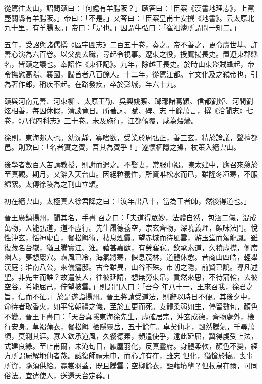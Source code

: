 \begin{pinyinscope}
 從駕往太山，詔問賾曰：「何處有羊腸阪？」賾答曰：「臣案《漢書地理志》，上黨壺關縣有羊腸阪。」帝曰：「不是。」又答曰：「臣案皇甫士安撰《地書》。云太原北
 九十里，有羊腸阪。」帝曰：「是也。」因謂牛弘曰：「崔祖濬所謂問一知二。」



 五年，受詔與諸儒撰《區宇圖志》二百五十卷，奏之。帝不善之，更令虞世基、許善心演為六百卷。以父憂去職，尋起令視事。遼東之役，授鷹揚長史。置遼東郡縣名，皆賾之議也。奉詔作《東征記》。九年，除越王長史。於時山東盜賊蜂起，帝令撫慰高陽、襄國，歸首者八百餘人。十二年，從駕江都。宇文化及之弒帝也，引為著作郎，稱疾不起。在路發疾，卒於彭城，年六十九。


賾與河南元善、河東柳
 、太原王劭、吳興姚察、瑯琊諸葛潁、信都劉焯、河間劉炫相善，每因休假，清談竟日。所著詞、賦、碑、志
 十餘萬言，撰《洽聞志》七卷，《八代四科志》三十卷。未及施行，江都傾覆，咸為煨燼。



 徐則，東海郯人也。幼沈靜，寡嗜欲，受業於周弘正，善三玄，精於論議，聲擅都邑。則歎曰：「名者實之賓，吾其為賓乎！」遂懷栖隱之操，杖策入縉雲山。



 後學者數百人苦請教授，則謝而遣之。不娶妻，常服巾褐。陳太建中，應召來憩於至真觀。期月，又辭入天台山。因絕粒養性，所資唯松水而已，雖隆冬冱寒，不服綿絮。太傅徐陵為之刊山立頌。



 初在縉雲山，太極真人徐君降之曰：「汝年出八十，當為王者師，然後得道也。」



 晉王廣鎮揚州，聞其名，手書
 召之曰：「夫道得眾妙，法體自然，包涵二儀，混成萬物，人能弘道，道不虛行。先生履德養空，宗玄齊物，深曉義理，頗味法門。悅性沖玄，恬神虛白，餐松餌術，棲息煙霞。望赤城而待風雲，游玉堂而駕龍鳳。雖復藏名台嶽，猶且騰實江、淮。藉甚嘉猷，有勞寤寐。欽承素道，久積虛襟，側席幽人，夢想巖穴。霜風已冷，海氣將寒，偃息茂林，道體休悆。昔商山四皓，輕舉漢庭；淮南八公，來儀籓邸。古今雖異，山谷不殊。市朝之隱，前賢已說。導凡述聖。非先生而誰？故遣使人，往彼延請，想無勞東帛，賁然來思，不待蒲輪，去彼空谷。希能屈己，佇望披雲。」則謂門人曰：「吾今
 年八十一，王來召我，徐君之旨，信而不征。」於是遂詣揚州。晉王將請受道法，則辭以時日不便。其後夕中，命待者取香火，如平常朝禮之儀，至於五更而死。支體柔弱如生，停留數旬，顏色不變。晉王下書曰：「天台真隱東海徐先生，虛確居宗，沖玄成德，齊物處外，檢行安身。草褐蒲衣，餐松餌，栖隱靈岳，五十餘年。卓矣仙才，飄然騰氣，千尋萬頃，莫測其涯。寡人欽承道風，久餐德素，頻遣使乎，遠此延屈，冀得虔受上法，式建良緣。至止甫爾，未淹旬日，厭塵羽化，反真靈府。身體柔軟，顏色不變，經方所謂屍解地仙者哉。誠復師禮未申，而心許有在，雖忘
 怛化，猶愴於懷。喪事所資，隨須供給。霓裳羽蓋，既且騰雲；空槨餘衣，詎藉墳壟？但杖舄在爾，可同俗法。宜遣使人，送還天台定葬。」



\end{pinyinscope}
